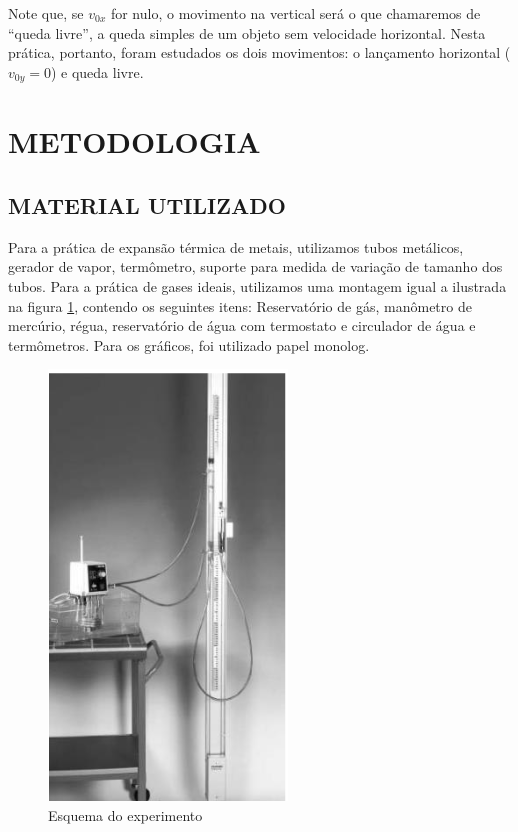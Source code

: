 \documentclass[10pt]{article}
\begin{document}
Note que, se $v_{0x}$ for nulo, o movimento na vertical será o que chamaremos de ``queda livre'', a queda simples de um objeto sem velocidade horizontal. Nesta prática, portanto, foram estudados os dois movimentos: o lançamento horizontal ($v_{0y} = 0$) e queda livre.

\section{METODOLOGIA}

\subsection{MATERIAL UTILIZADO}
Para a prática de expansão térmica de metais, utilizamos tubos metálicos, gerador de vapor, termômetro, suporte para medida de variação de tamanho dos tubos.
Para a prática de gases ideais, utilizamos uma montagem igual a ilustrada na figura \ref{fig:aparato_gases_ideais}, contendo os seguintes itens: Reservatório de gás, manômetro de mercúrio, régua, reservatório de água com termostato e circulador de água e termômetros. Para os gráficos, foi utilizado papel monolog. 

\begin{figure}
	\begin{center}
		\includegraphics[scale=0.5]{aparato_gases_ideais.png}
		\caption{Esquema do experimento}
		\label{fig:aparato_gases_ideais}
	\end{center}
\end{figure}
\end{document}
